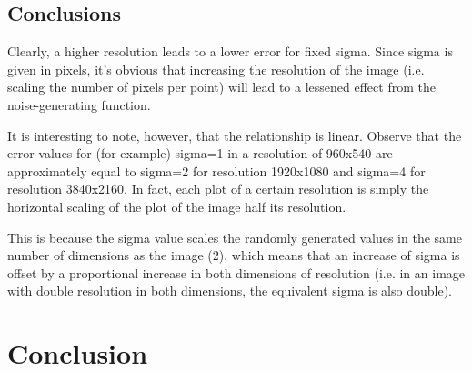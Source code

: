 \documentclass{article}
\begin{document}
\subsection{Conclusions}


Clearly, a higher resolution leads to a lower error for fixed sigma. Since sigma is given in pixels, it's obvious that increasing the resolution of the image (i.e. scaling the number of pixels per point) will lead to a lessened effect from the noise-generating function.



It is interesting to note, however, that the relationship is linear. Observe that the error values for (for example) sigma=1 in a resolution of 960x540 are approximately equal to sigma=2 for resolution 1920x1080 and sigma=4 for resolution 3840x2160. In fact, each plot of a certain resolution is simply the horizontal scaling of the plot of the image half its resolution. 


This is because the sigma value scales the randomly generated values in the same number of dimensions as the image (2), which means that an increase of sigma is offset by a proportional increase in both dimensions of resolution (i.e. in an image with double resolution in both dimensions, the equivalent sigma is also double).



\section{Conclusion}
\end{document}
